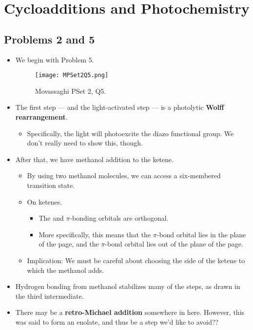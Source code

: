 \documentclass[../notes.tex]{subfiles}
\begin{document}
\chapter{Cycloadditions and Photochemistry}
\section{Problems 2 and 5}
\begin{itemize}
    \item {}We begin with Problem 5.
    \begin{figure}[h!]
        \centering
        \texttt{[image: MPSet2Q5.png]}
        \caption{Movassaghi PSet 2, Q5.}
        \label{fig:MPSet2Q5}
    \end{figure}
    \item The first step --- and the light-activated step --- is a photolytic \textbf{Wolff rearrangement}.
    \begin{itemize}
        \item Specifically, the light will photoexcite the diazo functional group. We don't really need to show this, though.
    \end{itemize}
    \item After that, we have methanol addition to the ketene.
    \begin{itemize}
        \item By using two methanol molecules, we can access a six-membered transition state.
        \item On ketenes.
        \begin{itemize}
            \item The  and  $\pi$-bonding orbitals are orthogonal.
            \item More specifically, this means that the  $\pi$-bond orbital lies in the plane of the page, and the  $\pi$-bond orbital lies out of the plane of the page.
        \end{itemize}
        \item Implication: We must be careful about choosing the side of the ketene to which the methanol adds.
    \end{itemize}
    \item Hydrogen bonding from methanol stabilizes many of the steps, as drawn in the third intermediate.
    \item There may be a \textbf{retro-Michael addition} somewhere in here. However, this was said to form an enolate, and thus be a step we'd like to avoid??

\end{itemize}
\end{document}
